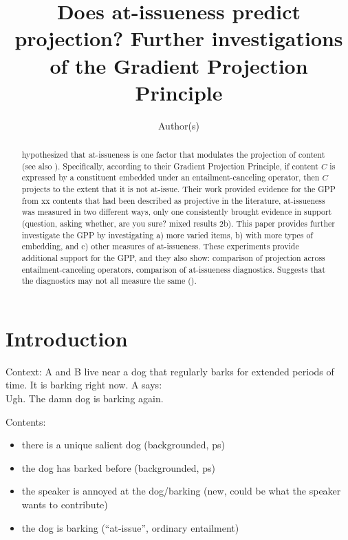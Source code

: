 \documentclass[11pt,fleqn]{article}
\title{Does at-issueness predict projection? Further investigations of the Gradient Projection Principle}
\author{Author(s)}
\newcommand{\6}{\mbox{$[\hspace*{-.6mm}[$}}
\newcommand{\9}{\mbox{$]\hspace*{-.6mm}]$}}
\begin{document}

\maketitle

\vspace*{-1cm}

\begin{abstract}

\citealt{tbd-variability} hypothesized that at-issueness is one factor that modulates the projection of content (see also \citealt{brst-salt10,brst-ar}). Specifically, according to their Gradient Projection Principle, if content $C$ is expressed by a constituent embedded under an entailment-canceling operator, then $C$ projects to the extent that it is not at-issue. Their work provided evidence for the GPP from xx contents that had been described as projective in the literature, at-issueness was measured in two different ways, only one consistently brought evidence in support (question, asking whether, are you sure? mixed results 2b). This paper provides further investigate the GPP by investigating a) more varied items, b) with more types of embedding, and c) other measures of at-issueness. These experiments provide additional support for the GPP, and they also show: comparison of projection across entailment-canceling operators, comparison of at-issueness diagnostics. Suggests that the diagnostics may not all measure the same (\citealt{snider2017}).

\end{abstract}

\newpage

\tableofcontents

\newpage
		
\section{Introduction}\label{s1}

\begin{exe}
\ex Context: A and B live near a dog that regularly barks for extended periods of time. It is barking right now. A says:  \\ Ugh. The damn dog is barking again.
\end{exe}

Contents:

\begin{itemize}
\item there is a unique salient dog (backgrounded, ps)
\item the dog has barked before (backgrounded, ps)
\item the speaker is annoyed at the dog/barking (new, could be what the speaker wants to contribute)
\item the dog is barking (``at-issue'', ordinary entailment)
\end{itemize}
\end{document}
